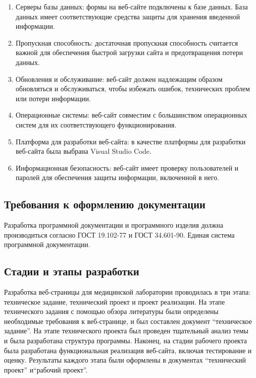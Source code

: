 \begin{enumerate}
	\item Серверы базы данных: формы на веб-сайте подключены к базе данных. База данных имеет соответствующие средства защиты для хранения введенной информации.
	\item Пропускная способность: достаточная пропускная способность считается важной для обеспечения быстрой загрузки сайта и предотвращения потери данных.
	\item Обновления и обслуживание: веб-сайт должен надлежащим образом обновляться и обслуживаться, чтобы избежать ошибок, технических проблем или потери информации.
	\item Операционные системы: веб-сайт совместим с большинством операционных систем для их соответствующего функционирования.
	\item Платформа для разработки веб-сайта: в качестве платформы для разработки веб-сайта была выбрана Visual Studio Code.
	\item Информационная безопасность: веб-сайт имеет проверку пользователей и паролей для обеспечения защиты информации, включенной в него.
\end{enumerate}

\subsection{Требования к оформлению документации}

Разработка программной документации и программного изделия должна производиться согласно ГОСТ 19.102-77 и ГОСТ 34.601-90. Единая система программной документации.

\subsection{Стадии и этапы разработки}

Разработка веб-страницы для медицинской лаборатории проводилась в три этапа: техническое задание, технический проект и проект реализации. На этапе технического задания с помощью обзора литературы были определены необходимые требования к веб-странице, и был составлен документ ``техническое задание''. На этапе технического проекта был проведен тщательный анализ темы и была разработана структура программы. Наконец, на стадии рабочего проекта была разработана функциональная реализация веб-сайта, включая тестирование и оценку. Результаты каждого этапа были оформлены в документах ``технический проект'' и``рабочий проект''.